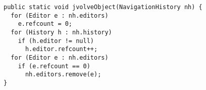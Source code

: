 \begin{figure}[t]
\begin{center}
\begin{minipage}{0.83\textwidth}
\begin{lstlisting}[frame=single]
public static void jvolveObject(NavigationHistory nh) {
  for (Editor e : nh.editors)
    e.refcount = 0;
  for (History h : nh.history)
    if (h.editor != null)
      h.editor.refcount++;
  for (Editor e : nh.editors)
    if (e.refcount == 0)
      nh.editors.remove(e);
}
\end{lstlisting}
\end{minipage} \\
\end{center}
\VspaceFixForHangcaption
\end{figure}
